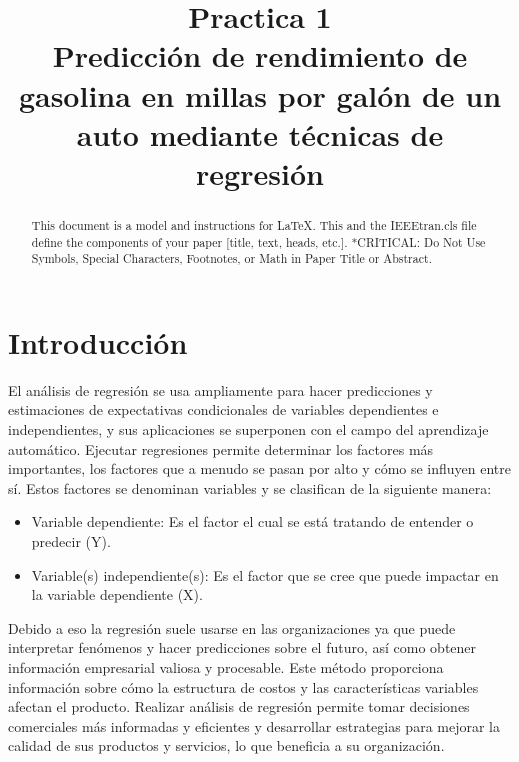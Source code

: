 \documentclass[conference]{IEEEtran}
\begin{document}
\title{Practica 1 \\ Predicción de rendimiento de gasolina en millas por galón de un auto mediante técnicas de regresión}

\author{
}

\maketitle

\begin{abstract}
This document is a model and instructions for \LaTeX.
This and the IEEEtran.cls file define the components of your paper [title, text, heads, etc.]. *CRITICAL: Do Not Use Symbols, Special Characters, Footnotes, 
or Math in Paper Title or Abstract.
\end{abstract}

\section{Introducción}

El análisis de regresión se usa ampliamente para hacer predicciones y estimaciones de expectativas condicionales de variables dependientes e independientes, y sus aplicaciones se superponen con el campo del aprendizaje automático. Ejecutar regresiones permite determinar los factores más importantes, los factores que a menudo se pasan por alto y cómo se influyen entre sí. Estos factores se denominan variables y se clasifican de la siguiente manera: \\

\begin{itemize}
\item Variable dependiente: Es el factor el cual se está tratando de entender o predecir (Y).
\item Variable(s) independiente(s): Es el factor que se cree que puede impactar en la variable dependiente (X). \\
\end{itemize}

Debido a eso la regresión suele usarse en las organizaciones ya que puede interpretar fenómenos y hacer predicciones sobre el futuro, así como obtener información empresarial valiosa y procesable. Este método proporciona información sobre cómo la estructura de costos y las características variables afectan el producto. Realizar análisis de regresión permite tomar decisiones comerciales más informadas y eficientes y desarrollar estrategias para mejorar la calidad de sus productos y servicios, lo que beneficia a su organización.
\end{document}
